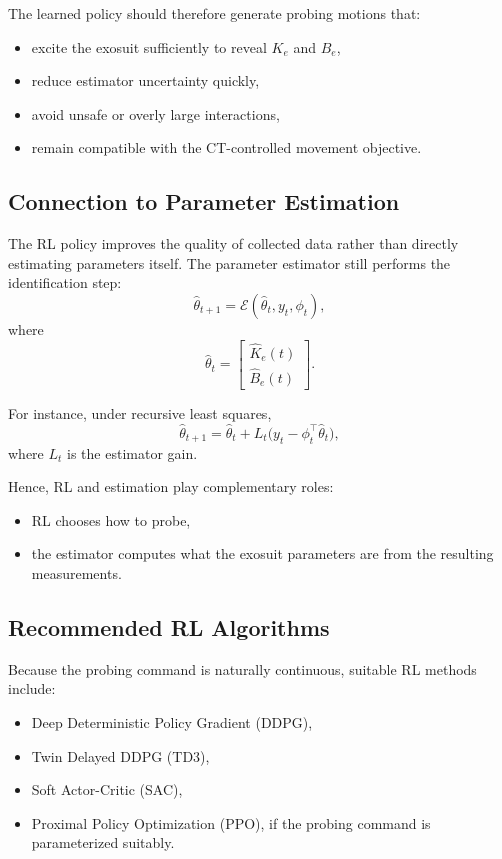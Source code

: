 \documentclass[11pt]{article}
\begin{document}
The learned policy should therefore generate probing motions that:
\begin{itemize}
    \item excite the exosuit sufficiently to reveal \(K_e\) and \(B_e\),
    \item reduce estimator uncertainty quickly,
    \item avoid unsafe or overly large interactions,
    \item remain compatible with the CT-controlled movement objective.
\end{itemize}

\subsection{Connection to Parameter Estimation}

The RL policy improves the quality of collected data rather than directly estimating parameters itself. The parameter estimator still performs the identification step:
\begin{equation}
\hat{\theta}_{t+1} = \mathcal{E}(\hat{\theta}_t, y_t, \phi_t),
\end{equation}
where
\begin{equation}
\hat{\theta}_t =
\begin{bmatrix}
\hat{K}_e(t)\\
\hat{B}_e(t)
\end{bmatrix}.
\end{equation}

For instance, under recursive least squares,
\begin{equation}
\hat{\theta}_{t+1}
=
\hat{\theta}_t
+
L_t \bigl(y_t-\phi_t^\top \hat{\theta}_t\bigr),
\end{equation}
where \(L_t\) is the estimator gain.

Hence, RL and estimation play complementary roles:
\begin{itemize}
    \item RL chooses how to probe,
    \item the estimator computes what the exosuit parameters are from the resulting measurements.
\end{itemize}

\subsection{Recommended RL Algorithms}

Because the probing command is naturally continuous, suitable RL methods include:
\begin{itemize}
    \item Deep Deterministic Policy Gradient (DDPG),
    \item Twin Delayed DDPG (TD3),
    \item Soft Actor-Critic (SAC),
    \item Proximal Policy Optimization (PPO), if the probing command is parameterized suitably.
\end{itemize}
\end{document}

